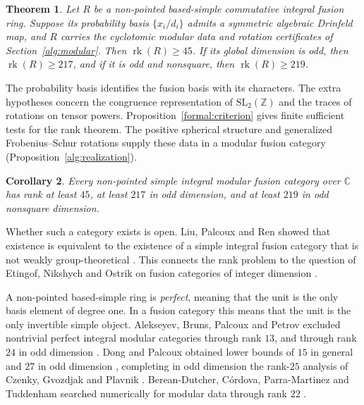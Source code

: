 \documentclass[11pt]{amsart}
\numberwithin{equation}{section}
\theoremstyle{definition}
\theoremstyle{plain}
\newtheorem{mainthm}{Theorem}
\newtheorem{maincor}[mainthm]{Corollary}
\newcommand{\ZZ}{\mathbb Z}
\begin{document}
\begin{mainthm}\label{alg:rank}
Let $R$ be a non-pointed based-simple commutative integral fusion ring.
Suppose its probability basis $\{x_i/d_i\}$ admits a symmetric
algebraic Drinfeld map, and $R$ carries the cyclotomic modular data
and rotation certificates of Section~\ref{alg:modular}. Then
$\operatorname{rk}(R)\ge45$. If its global dimension is odd, then
$\operatorname{rk}(R)\ge217$, and if it is odd and nonsquare, then
$\operatorname{rk}(R)\ge219$.
\end{mainthm}

The probability basis identifies the fusion basis with its characters. The extra hypotheses concern the congruence representation of $\mathrm{SL}_2(\ZZ)$ and the traces of rotations on tensor powers. Proposition~\ref{formal:criterion} gives finite sufficient tests for the rank theorem. The positive spherical structure and generalized Frobenius--Schur rotations supply these data in a modular fusion category (Proposition~\ref{alg:realization}).
\begin{maincor}\label{main:rank}
Every non-pointed simple integral modular fusion category over
$\mathbb C$ has rank at least $45$, at least $217$ in odd dimension,
and at least $219$ in odd nonsquare dimension.
\end{maincor}

Whether such a category exists is open. Liu, Palcoux and Ren showed
that existence is equivalent to the existence of a simple integral
fusion category that is not weakly group-theoretical
\cite[Question~1.3 and Theorem~5.8]{LPR}. This connects the rank
problem to the question of Etingof, Nikshych and Ostrik on fusion
categories of integer dimension \cite[Question~2]{ENOWGT}.

A non-pointed based-simple ring is \emph{perfect}, meaning that the
unit is the only basis element of degree one. In a fusion category
this means that the unit is the only invertible simple object.
Alekseyev, Bruns, Palcoux and Petrov excluded nontrivial perfect
integral modular categories through rank $13$, and through rank $24$ in odd dimension \cite[Theorems~1.5 and~12.2]{ABPP}.
Dong and Palcoux obtained lower bounds of $15$ in general and $27$
in odd dimension \cite[Corollaries~1.2 and~1.3]{DP}, completing in
odd dimension the rank-$25$ analysis of Czenky, Gvozdjak and Plavnik
\cite[Theorem~1.1]{CGP}. Berean-Dutcher, C\'ordova, Parra-Martinez
and Tuddenham searched numerically for modular data through rank $22$
\cite[Introduction and \S3]{Atlas}.
\end{document}
